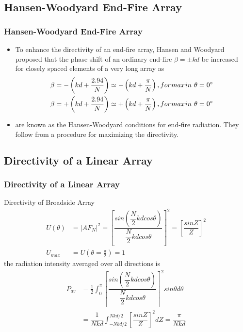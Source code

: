 \documentclass{beamer}
\begin{document}
	\begin{frame}
		\subsection{Hansen-Woodyard End-Fire Array}
		\frametitle{Hansen-Woodyard End-Fire Array}
		\begin{itemize}
			\item To enhance the directivity of an end-fire
			array, Hansen and Woodyard proposed that the phase shift of an ordinary
			end-fire $ \beta = \pm kd $ be increased for closely spaced elements of a very long array as
			\begin{align}
			\beta & = -\left(kd+\dfrac{2.94}{N}\right)\simeq-\left(kd+\dfrac{\pi}{N}\right), for\hskip0.01in max\hskip0.01in in\hskip0.05in \theta = 0^\circ\\
			\beta & = +\left(kd+\dfrac{2.94}{N}\right)\simeq+\left(kd+\dfrac{\pi}{N}\right), for\hskip0.01in max\hskip0.01in in\hskip0.05in \theta = 0^\circ
			\end{align}
			\item[] are known as the Hansen-Woodyard conditions
			for end-fire radiation. They follow from a procedure for maximizing the directivity.
		\end{itemize}
	\end{frame}
	\begin{frame}
		\section{Directivity of a Linear Array}
		\frametitle{Directivity of a Linear Array}
		\color{blue}Directivity of Broadside Array\color{black}
		\begin{align}
		U(\theta)& = |AF_N|^2 = \left[ \dfrac{sin\left(\dfrac{N}{2}kdcos\theta\right)}{\dfrac{N}{2}kdcos\theta}\right]^2 = \left[\dfrac{sinZ}{Z}\right]^2\\
		U_{max}& = U(\theta = \frac{\pi}{2}) = 1
		\end{align}
		the radiation intensity averaged over all directions is
		\begin{align}
		P_{av}& = \frac{1}{2}\int_{0}^{\pi}\left[ \dfrac{sin\left(\dfrac{N}{2}kdcos\theta\right)}{\dfrac{N}{2}kdcos\theta}\right]^2 sin\theta d\theta\\
		&= \dfrac{1}{Nkd}\int_{-Nkd/2}^{Nkd/2}\left[\dfrac{sinZ}{Z}\right]^2dZ = \dfrac{\pi}{Nkd}
		\end{align}
	\end{frame}
\end{document}
